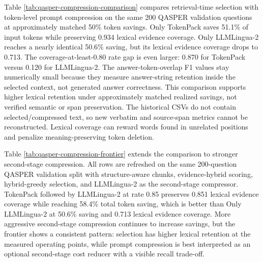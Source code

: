 \documentclass[conference]{IEEEtran}
\begin{document}
Table \ref{tab:qasper-compression-comparison} compares retrieval-time selection with token-level prompt compression on the same 200 QASPER validation questions at approximately matched 50\% token savings. Only TokenPack saves 51.1\% of input tokens while preserving 0.934 lexical evidence coverage. Only LLMLingua-2 reaches a nearly identical 50.6\% saving, but its lexical evidence coverage drops to 0.713. The coverage-at-least-0.80 rate gap is even larger: 0.870 for TokenPack versus 0.120 for LLMLingua-2. The answer-token-overlap F1 values stay numerically small because they measure answer-string retention inside the selected context, not generated answer correctness. This comparison supports higher lexical retention under approximately matched realized savings, not verified semantic or span preservation. The historical CSVs do not contain selected/compressed text, so new verbatim and source-span metrics cannot be reconstructed. Lexical coverage can reward words found in unrelated positions and penalize meaning-preserving token deletion.



Table \ref{tab:qasper-compression-frontier} extends the comparison to stronger second-stage compression. All rows are refreshed on the same 200-question QASPER validation split with structure-aware chunks, evidence-hybrid scoring, hybrid-greedy selection, and LLMLingua-2 as the second-stage compressor. TokenPack followed by LLMLingua-2 at rate 0.85 preserves 0.851 lexical evidence coverage while reaching 58.4\% total token saving, which is better than Only LLMLingua-2 at 50.6\% saving and 0.713 lexical evidence coverage. More aggressive second-stage compression continues to increase savings, but the frontier shows a consistent pattern: selection has higher lexical retention at the measured operating points, while prompt compression is best interpreted as an optional second-stage cost reducer with a visible recall trade-off.


\end{document}
